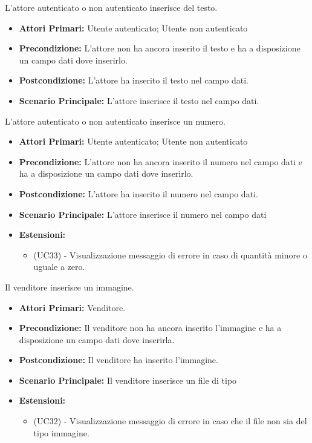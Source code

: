 L'attore autenticato o non autenticato inserisce del testo.
\begin{itemize}
    \item \textbf{Attori Primari:} Utente autenticato; Utente non autenticato
    \item \textbf{Precondizione:} L'attore non ha ancora inserito il testo e ha a disposizione un campo dati dove inserirlo.
    \item \textbf{Postcondizione:} L'attore ha inserito il testo nel campo dati.
    \item \textbf{Scenario Principale:} L'attore inserisce il testo nel campo dati.
\end{itemize}

L'attore autenticato o non autenticato inserisce un numero.
\begin{itemize}
    \item \textbf{Attori Primari:} Utente autenticato; Utente non autenticato
    \item \textbf{Precondizione:} L'attore non ha ancora inserito il numero nel campo dati e ha a disposizione un campo dati dove inserirlo.
    \item \textbf{Postcondizione:} L'attore ha inserito il numero nel campo dati.
    \item \textbf{Scenario Principale:} L'attore inserisce il numero nel campo dati
    \item \textbf{Estensioni:}
    \begin{itemize}
        \item (UC33) - Visualizzazione messaggio di errore in caso di quantità minore o uguale a zero.
    \end{itemize}
\end{itemize}

Il venditore inserisce un immagine.
\begin{itemize}
    \item \textbf{Attori Primari:} Venditore.
    \item \textbf{Precondizione:} Il venditore non ha ancora inserito l'immagine e ha a disposizione un campo dati dove inserirla.
    \item \textbf{Postcondizione:} Il venditore ha inserito l'immagine.
    \item \textbf{Scenario Principale:} Il venditore inserisce un file di tipo \immagine
    \item \textbf{Estensioni:}
    \begin{itemize}
        \item (UC32) - Visualizzazione messaggio di errore in caso che il file non sia del tipo immagine.
    \end{itemize}
\end{itemize}
